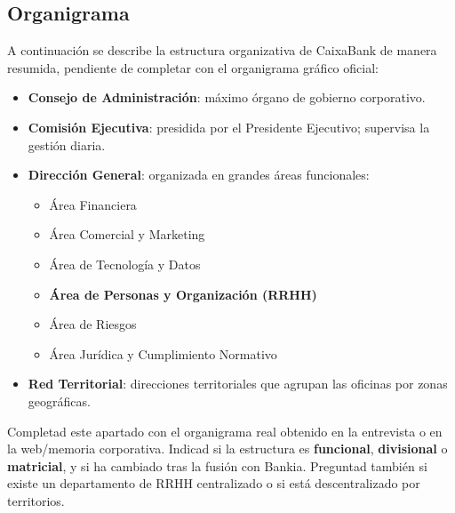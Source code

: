 \subsection{Organigrama}

%


A continuación se describe la estructura organizativa de CaixaBank de manera
resumida, pendiente de completar con el organigrama gráfico oficial:

\begin{itemize}
  \item \textbf{Consejo de Administración}: máximo órgano de gobierno corporativo.
  \item \textbf{Comisión Ejecutiva}: presidida por el Presidente Ejecutivo; supervisa
        la gestión diaria.
  \item \textbf{Dirección General}: organizada en grandes áreas funcionales:
    \begin{itemize}
      \item Área Financiera
      \item Área Comercial y Marketing
      \item Área de Tecnología y Datos
      \item \textbf{Área de Personas y Organización (RRHH)}
      \item Área de Riesgos
      \item Área Jurídica y Cumplimiento Normativo
    \end{itemize}
  \item \textbf{Red Territorial}: direcciones territoriales que agrupan las
        oficinas por zonas geográficas.
\end{itemize}

\begin{notaequipo}
  Completad este apartado con el organigrama real obtenido en la entrevista o
  en la web/memoria corporativa. Indicad si la estructura es \textbf{funcional},
  \textbf{divisional} o \textbf{matricial}, y si ha cambiado tras la fusión con
  Bankia. Preguntad también si existe un departamento de RRHH centralizado o
  si está descentralizado por territorios.
\end{notaequipo}
